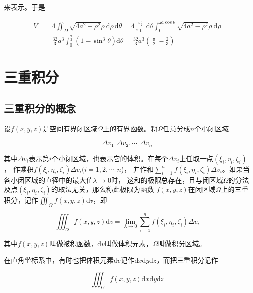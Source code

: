 \documentclass[12pt, a4paper]{article}
\numberwithin{equation}{section}
\newcommand{\rmd}{\mathrm{d}}
\begin{document}
    来表示。于是

        $$
        \begin{aligned}
            V & =4 \iint_D \sqrt{4 a^2-\rho^2} \rho \mathrm{~d} \rho \mathrm{~d} \theta=4 \int_0^{\frac{\uppi}{2}} \mathrm{~d} \theta \int_0^{2 a \cos \theta} \sqrt{4 a^2-\rho^2} \rho \mathrm{~d} \rho \\
            & =\frac{32}{3} a^3 \int_0^{\frac{\uppi}{2}}\left(1-\sin ^3 \theta\right) \mathrm{d} \theta=\frac{32}{3} a^3\left(\frac{\uppi}{2}-\frac{2}{3}\right)
        \end{aligned}
    $$

\section{三重积分}

\subsection{三重积分的概念}

    设\(f\left(x,y,z\right)\)是空间有界闭区域\(\varOmega\)上的有界函数。将\(\varOmega\)任意分成\(n \)个小闭区域

    $$
        \Delta v_1, \Delta v_2, \cdots, \Delta v_n
    $$

    其中\(\Delta v_i\)表示第\(i \)个小闭区域，也表示它的体积。在每个\(\Delta v_i\)上任取一点\(\left(\xi_i, \eta_i, \zeta_i\right)\)，
    作乘积\(f\left(\xi_i, \eta_i, \zeta_i\right) \Delta v_i\)($i=1,2,\cdots,n$)，
    并作和\(\sum_{i=1}^{n} f\left(\xi_i, \eta_i, \zeta_i\right) \Delta v_i \)。如果当各小闭区域的直径中的最大值\(\lambda \rightarrow 0\)时，
    这和的极限总存在，且与闭区域\(\varOmega\)的分法及点\(\left(\xi_i, \eta_i, \zeta_i\right)\)的取法无关，那么称此极限为函数
    \(f\left(x,y,z\right)\)在闭区域\(\varOmega\)上的三重积分，记作\({\displaystyle \iiint_{\varOmega} f(x, y, z) \mathrm{d} v}\)，即

    \begin{equation}
        \iiint_{\varOmega} f(x, y, z) \mathrm{d} v=\lim _{\lambda \rightarrow 0} \sum_{i=1}^n f\left(\xi_i, \eta_i, \zeta_i\right) \Delta v_i
    \end{equation}

    其中\(f\left(x,y,z\right)\)叫做被积函数，\(\rmd v\)叫做体积元素，\(\varOmega\)叫做积分区域。

    在直角坐标系中，有时也把体积元素\(\rmd v\)记作\(\rmd x \rmd y \rmd z\)，而把三重积分记作

    \begin{equation*}
        \iiint_\varOmega f\left(x,y,z \right) \rmd x \rmd y \rmd z
    \end{equation*}
\end{document}
